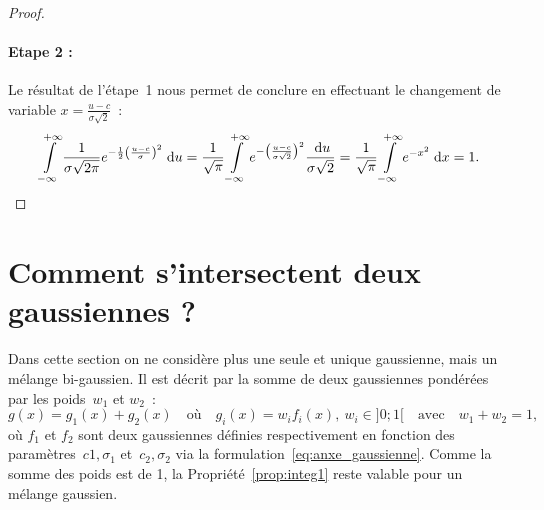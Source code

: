 \documentclass[main.tex]{subfiles}
\begin{document}
\begin{proof}
\paragraph{Etape 2 :} Le résultat de l'étape~1 nous permet de conclure  en effectuant le changement de variable $x=\frac{u-c}{\sigma \sqrt{2}}$~:
\begin{equation*}
 \int\limits_{-\infty}^{+\infty} \frac{1}{\sigma\sqrt{2\pi}} e^{-\frac{1}{2}\left(\frac{u-c}{\sigma}\right)^2} \;{\rm d}u
= \frac{1}{\sqrt{\pi}} \int\limits_{-\infty}^{+\infty} e^{-\left(\frac{u-c}{\sigma \sqrt{2}}\right)^2} \frac{\;{\rm d}u}{\sigma\sqrt{2}} =\frac{1}{\sqrt{\pi}} \int\limits_{-\infty}^{+\infty} e^{-x^2} \;{\rm d}x = 1.
\end{equation*}
\end{proof}



\section{Comment s'intersectent deux gaussiennes ?}
Dans cette section on ne considère plus une seule et unique gaussienne, mais un mélange bi-gaussien. Il est décrit par la somme de deux gaussiennes pondérées par les poids~$w_1$ et $w_2$~:
\begin{equation}
\label{eq:anxe_bi_gauss}
g(x)= g_1(x)+ g_2(x) \quad \textrm{où} \quad g_i(x)=w_if_i(x), \ w_i\in ]0;1[  \quad \textrm{avec} \quad w_1 + w_2=1,
\end{equation}
où $f_1$ et $f_2$ sont deux gaussiennes définies respectivement en fonction des paramètres~$c1,\sigma_1$ et~$c_2,\sigma_2$ via la formulation~\eqref{eq:anxe_gaussienne}. Comme la somme des poids est de 1, la Propriété~\ref{prop:integ1} reste valable pour un mélange gaussien.
\end{document}
